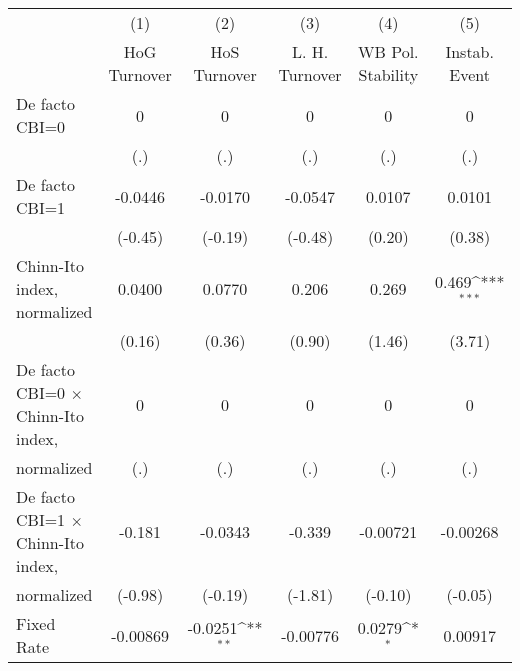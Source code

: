 \begin{table}[htbp]\centering
\def\sym#1{\ifmmode^{#1}\else\(^{#1}\)\fi}
\caption{\label{ikmultIndFEDF}}
\begin{tabular}{l*{5}{c}}
\toprule
                                        &\multicolumn{1}{c}{(1)}&\multicolumn{1}{c}{(2)}&\multicolumn{1}{c}{(3)}&\multicolumn{1}{c}{(4)}&\multicolumn{1}{c}{(5)}\\
                                        &\multicolumn{1}{c}{HoG Turnover}&\multicolumn{1}{c}{HoS Turnover}&\multicolumn{1}{c}{L. H. Turnover}&\multicolumn{1}{c}{WB Pol. Stability}&\multicolumn{1}{c}{Instab. Event}\\
\midrule
De facto CBI=0                          &        0         &        0         &        0         &        0         &        0         \\
                                        &      (.)         &      (.)         &      (.)         &      (.)         &      (.)         \\
\addlinespace
De facto CBI=1                          &  -0.0446         &  -0.0170         &  -0.0547         &   0.0107         &   0.0101         \\
                                        &  (-0.45)         &  (-0.19)         &  (-0.48)         &   (0.20)         &   (0.38)         \\
\addlinespace
Chinn-Ito index, normalized             &   0.0400         &   0.0770         &    0.206         &    0.269         &    0.469\sym{***}\\
                                        &   (0.16)         &   (0.36)         &   (0.90)         &   (1.46)         &   (3.71)         \\
\addlinespace
De facto CBI=0 $\times$ Chinn-Ito index,&        0         &        0         &        0         &        0         &        0         \\
normalized                              &      (.)         &      (.)         &      (.)         &      (.)         &      (.)         \\
\addlinespace
De facto CBI=1 $\times$ Chinn-Ito index,&   -0.181         &  -0.0343         &   -0.339         & -0.00721         & -0.00268         \\
normalized                              &  (-0.98)         &  (-0.19)         &  (-1.81)         &  (-0.10)         &  (-0.05)         \\
\addlinespace
Fixed Rate                              & -0.00869         &  -0.0251\sym{**} & -0.00776         &   0.0279\sym{*}  &  0.00917         \\

\end{tabular}
\end{table}
